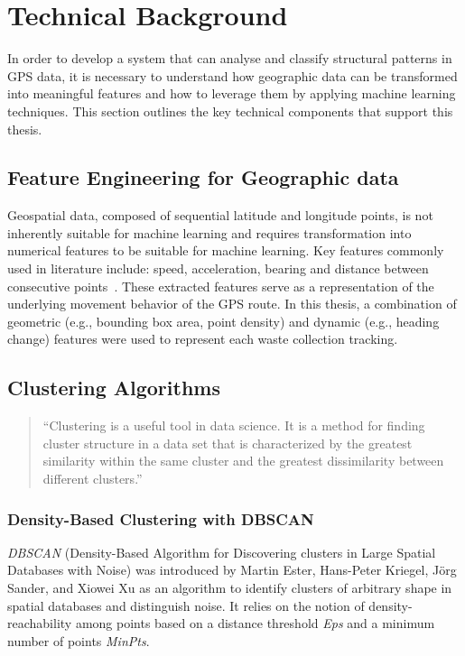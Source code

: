 \documentclass[a4paper,12pt,twoside]{scrreprt}
\begin{document}
\section{Technical Background}
In order to develop a system that can analyse and classify structural patterns
in GPS data, it is necessary to understand how geographic data can be
transformed into meaningful features and how to leverage them by applying
machine learning techniques.
This section outlines the key technical components that support this thesis.

\subsection{Feature Engineering for Geographic data}
Geospatial data, composed of sequential latitude and longitude points,
is not inherently suitable for machine learning and requires transformation
into numerical features to be suitable for machine learning.
Key features commonly used in literature include: speed, acceleration, bearing
and distance between consecutive points~\cite{etemad_predicting_2018}.
These extracted features serve as a representation of the underlying movement
behavior of the GPS route.
In this thesis, a combination of geometric (e.g., bounding box area, point
density) and dynamic (e.g., heading change) features were used to represent
each waste collection tracking.

\subsection{Clustering Algorithms}
\begin{quote}
  ``Clustering is a useful tool in data science. It is a method for
  finding cluster structure in a data set that is characterized by
  the greatest similarity within the same cluster and the
  greatest dissimilarity between different
  clusters.''\cite{sinaga_pdf_2024}
\end{quote}

\subsubsection{Density-Based Clustering with DBSCAN}

\textit{DBSCAN} (Density-Based Algorithm for Discovering clusters in Large
Spatial Databases with Noise) was
introduced by Martin Ester, Hans-Peter Kriegel, Jörg Sander, and Xiowei Xu as
an algorithm to
identify
clusters of arbitrary shape in spatial databases and distinguish noise. It
relies on the notion of density-reachability among points based on a distance
threshold \textit{Eps} and a minimum number of points
\textit{MinPts}.\cite{ester_density-based_nodate}
\end{document}
